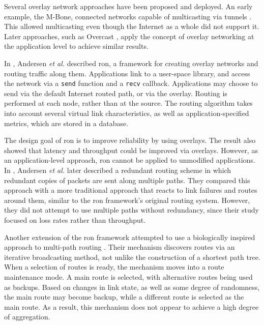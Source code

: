 \documentclass{cwru}
\begin{document}
Several overlay network approaches have been proposed and deployed. An early
example, the M-Bone, connected networks capable of multicasting via tunnels
\cite{mbone}. This allowed multicasting even though the Internet as a whole did
not support it. Later approaches, such as Overcast \cite{jannotti2000overcast},
apply the concept of overlay networking at the application level to achieve
similar results.

In \cite{ron}, Andersen \textit{et al.} described \ac{ron}, a framework for
creating overlay networks and routing traffic along them. Applications link to a
user-space library, and access the network via a \texttt{send} function and a
\texttt{recv} callback. Applications may choose to send via the default Internet
routed path, or via the overlay. Routing is performed at each node, rather than
at the source. The routing algorithm takes into account several virtual link
characteristics, as well as application-specified metrics, which are stored in a
database.

The design goal of \ac{ron} is to improve reliability by using overlays. The
result also showed that latency and throughput could be improved via overlays.
However, as an application-level approach, \ac{ron} cannot be applied to
unmodified applications. In \cite{andersen2003best}, Andersen \textit{et al.}
later described a redundant routing scheme in which redundant copies of packets
are sent along multiple paths. They compared this approach with a more
traditional approach that reacts to link failures and routes around them,
similar to the \ac{ron} framework's original routing system. However, they did
not attempt to use multiple paths without redundancy, since their study focused
on loss rates rather than throughput.

Another extension of the \ac{ron} framework attempted to use a biologically
inspired approach to multi-path routing \cite{leibnitz2006biologically}. Their
mechanism discovers routes via an iterative broadcasting method, not unlike the
construction of a shortest path tree. When a selection of routes is ready, the
mechanism moves into a route maintenance mode. A main route is selected, with
alternative routes being used as backups. Based on changes in link state, as
well as some degree of randomness, the main route may become backup, while a
different route is selected as the main route. As a result, this mechanism does
not appear to achieve a high degree of aggregation.
\end{document}
